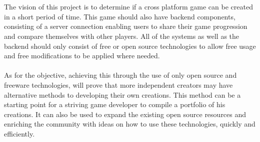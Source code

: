 \documentclass[letterpaper]{article}
\begin{document}
		\vspace{0.2in}
		
		\section*{\colorbox{blue}{}} 
		
		The vision of this project is to determine if a cross platform game can be created in a short period of time. This game should also have backend components, consisting of a server connection enabling users to share their game progression and compare themselves with other players. All of the systems as well as the backend should only consist of free or open source technologies to allow free usage and free modifications to be applied where needed.
		\\
		\\
		As for the objective, achieving this through the use of only open source and freeware technologies, will prove that more independent creators may have alternative methods to developing their own creations. This method can be a starting point for a striving game developer to compile a portfolio of his creations. It can also be used to expand the existing open source resources and enriching the community with ideas on how to use these technologies, quickly and efficiently.
		
		\vspace{0.2in}
				
		\section*{\colorbox{blue}{}} 
		
		\vspace{0.2in}
		
\end{document}
